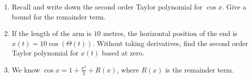 \begin{enumerate}
\begin{enumerate}
        \item Recall and write down the second order Taylor polynomial for $\cos{x}$. Give a bound for the remainder term. 
        \item If the length of the arm is $10$ metres, the horizontal position of the end is $x(t) = 10 \cos(\Theta(t))$. Without taking derivatives, find the second order Taylor polynomial for $x(t)$ based at zero. 
        
        \item  We know $\cos x = 1 + \frac{x^2}{2} + R(x)$, where $R(x)$ is the remainder term. 

        
    \end{enumerate}
		
\end{enumerate}
